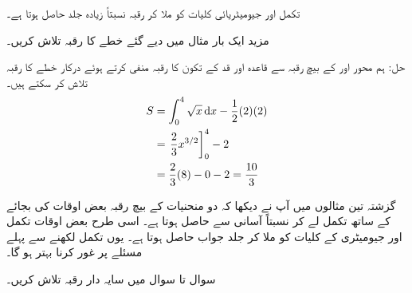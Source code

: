 تکمل اور جیومیٹریائی کلیات کو ملا کر رقبہ نسبتاً زیادہ جلد حاصل ہوتا ہے۔

مزید ایک بار مثال  میں دیے گئے خطے کا رقبہ تلاش کریں۔

حل:\quad
ہم  محور   اور  کے بیچ رقبہ سے قاعدہ  اور قد  کے تکون کا رقبہ منفی کرتے ہوئے درکار خطے کا رقبہ تلاش کر سکتے ہیں۔ 
\begin{align*}
S&=\int_0^4\sqrt{x}\dif x-\frac{1}{2}(2)(2)\\
&=\left. \frac{2}{3}x^{3/2}\right]_0^4-2\\
&=\frac{2}{3}(8)-0-2=\frac{10}{3}
\end{align*}

گزشتہ تین مثالوں میں آپ نے دیکھا کہ دو منحنیات کے بیچ رقبہ بعض اوقات  کی بجائے  کے ساتھ تکمل لے کر نسبتاً آسانی سے حاصل ہوتا ہے۔ اسی طرح بعض اوقات تکمل اور جیومیٹری کے کلیات کو ملا کر جلد جواب حاصل ہوتا ہے۔ یوں تکمل لکھنے سے پہلے مسئلے پر غور کرنا بہتر ہو گا۔

سوال  تا سوال  میں سایہ دار رقبہ تلاش کریں۔

